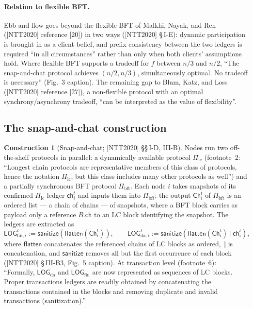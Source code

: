 \documentclass[11pt,a4paper]{article}
\theoremstyle{definition}
\newtheorem{construction}[theorem]{Construction}
\begin{document}
\paragraph{Relation to flexible BFT.} Ebb-and-flow goes beyond the
flexible BFT of Malkhi, Nayak, and Ren ([NTT2020] reference [20]) in two
ways ([NTT2020] \S\,I-E): dynamic participation is brought in as a client
belief, and prefix consistency between the two ledgers is required ``in
all circumstances'' rather than only when both clients' assumptions hold.
Where flexible BFT supports a tradeoff for $f$ between $n/3$ and $n/2$,
``The snap-and-chat protocol achieves $(n/2, n/3)$, simultaneously
optimal. No tradeoff is necessary'' (Fig.~3 caption). The remaining gap to
Blum, Katz, and Loss ([NTT2020] reference [27]), a non-flexible protocol
with an optimal synchrony/asynchrony tradeoff, ``can be interpreted as the
value of flexibility''.

\subsection{The snap-and-chat construction}\label{sec:xl-snap-and-chat}

\begin{construction}[Snap-and-chat; {[NTT2020]} \S\S\,I-D, III-B]
\label{def:xl-sac}
Nodes run two off-the-shelf protocols in parallel: a dynamically available
protocol $\Pi_{\mathrm{lc}}$ (footnote~2: ``Longest chain protocols are
representative members of this class of protocols, hence the notation
$\Pi_{\mathrm{lc}}$, but this class includes many other protocols as
well'') and a partially synchronous BFT protocol $\Pi_{\mathrm{bft}}$.
Each node $i$ takes snapshots of its confirmed $\Pi_{\mathrm{lc}}$ ledger
$\mathsf{ch}_i^t$ and inputs them into $\Pi_{\mathrm{bft}}$; the output
$\mathsf{Ch}_i^t$ of $\Pi_{\mathrm{bft}}$ is an ordered list --- a chain
of chains --- of snapshots, where a BFT block carries as payload only a
reference $B.\mathsf{ch}$ to an LC block identifying the snapshot. The
ledgers are extracted as
\[
\mathsf{LOG}_{\mathrm{fin},i}^t :=
  \mathsf{sanitize}(\mathsf{flatten}(\mathsf{Ch}_i^t)),
\qquad
\mathsf{LOG}_{\mathrm{da},i}^t :=
  \mathsf{sanitize}(\mathsf{flatten}(\mathsf{Ch}_i^t)
    \,\Vert\, \mathsf{ch}_i^t),
\]
where $\mathsf{flatten}$ concatenates the referenced chains of LC blocks
as ordered, $\Vert$ is concatenation, and $\mathsf{sanitize}$ removes all
but the first occurrence of each block ([NTT2020] \S\,III-B3, Fig.~5
caption). At transaction level (footnote~6): ``Formally,
$\mathsf{LOG}_{\mathrm{da}}$ and $\mathsf{LOG}_{\mathrm{fin}}$ are now
represented as sequences of LC blocks. Proper transactions ledgers are
readily obtained by concatenating the transactions contained in the blocks
and removing duplicate and invalid transactions (sanitization).''
\end{construction}
\end{document}
